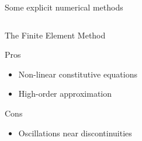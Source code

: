 \begin{withoutheadline}
\begin{frame}{Some explicit numerical methods}
\begin{overprint}
      \begin{columns}
        \begin{column}{0.49\textwidth}
          \vspace{-0.1cm}
          \begin{block}{The Finite Element Method \cite{Belytschko}}
            \begin{footnotesize}
              \begin{block}{\footnotesize Pros}
                \vspace{-0.2cm}
                \begin{itemize}
                \item[] Non-linear constitutive equations
                \item[] High-order approximation 
                \end{itemize}
              \end{block}
              \vspace{-0.2cm}
              \begin{block}{\footnotesize Cons}
                \vspace{-0.2cm}
                \begin{itemize}
                \item[] Oscillations near discontinuities
                \end{itemize}
              \end{block}
            \end{footnotesize}
          \end{block}
          

\end{column}
\end{columns}
\end{overprint}
\end{frame}
\end{withoutheadline}
